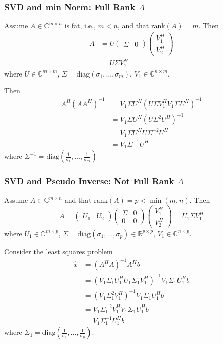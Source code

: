 \documentclass{beamer}
\begin{document}
\begin{frame}\frametitle{SVD and min Norm: Full Rank $A$}
	Assume $A\in\mathbb{C}^{m\times n}$ is fat, i.e.,  $m < n$, and that $\text{rank}(A) = m$.  Then
	\begin{align*}
		A &= U \begin{pmatrix}
		      		\Sigma & 0
		    	\end{pmatrix}
		    	\begin{pmatrix}
		  			V_1^H\\
		  			V_2^H
				\end{pmatrix} \\ 
		&= U\Sigma V_1^H				
	\end{align*}
	where $U\in\mathbb{C}^{m\times m}$, 
	$\Sigma=\text{diag}(\sigma_1, \dots, \sigma_m)$, 
	$V_1 \in \mathbb{C}^{n\times m}$.
	
	\vfill
	
	Then 
	\begin{align*}
		A^H (A A^H)^{-1} 
			&= V_1 \Sigma U^H(U\Sigma V_1^HV_1\Sigma U^H)^{-1}\\
			&= V_1 \Sigma U^H(U\Sigma^2U^H)^{-1}\\
			&= V_1 \Sigma U^HU\Sigma^{-2}U^H\\
			&= V_1 \Sigma^{-1}U^H
	\end{align*}
	where $\Sigma^{-1} = \text{diag}(\frac{1}{\sigma_1}, \dots, \frac{1}{\sigma_m})$
\end{frame}

\begin{frame}\frametitle{SVD and Pseudo Inverse: Not Full Rank $A$}
	Assume $A\in\mathbb{C}^{m\times n}$ and that $\text{rank}(A) = p < \min(m,n)$.  Then
	\[ 
		A = 
			\begin{pmatrix} 
				U_1 & U_2	
			\end{pmatrix}
			\begin{pmatrix}
				\Sigma & 0 \\ 0 & 0	
			\end{pmatrix}
			\begin{pmatrix}
				V_1^H \\ V_2^H	
			\end{pmatrix}
		= U_1 \Sigma V_1^H
	\]
	where
	$U_1\in\mathbb{C}^{m\times p}$, 
	$\Sigma = \text{diag}(\sigma_1, \dots, \sigma_p) \in \mathbb{R}^{p\times p}$,
	$V_1 \in \mathbb{C}^{n \times p}$.

	Consider the least squares problem
	\begin{align*}
		\hat{x} &= (A^HA)^{-1}A^Hb\\
		&= (V_1\Sigma_1U_1^HU_1\Sigma_1V_1^H)^{-1}V_1\Sigma_1U_1^Hb\\
		&= (V_1\Sigma_1^2V_1^H)^{-1}V_1\Sigma_1U_1^Hb\\
		&= V_1\Sigma_1^{-2}V_1^HV_1\Sigma_1U_1^Hb\\
		&= V_1\Sigma_1^{-1}U_1^Hb
	\end{align*}
	where 
	$\Sigma_1 = \text{diag}(\frac{1}{\sigma_1}, \dots, \frac{1}{\sigma_p})$.
\end{frame}
\end{document}
